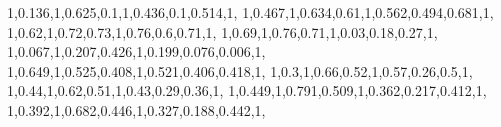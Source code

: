 \documentclass[
]{book}
\newenvironment{Shaded}{\begin{snugshade}}{\end{snugshade}}
\newcommand{\DecValTok}[1]{\textcolor[rgb]{0.00,0.00,0.81}{#1}}
\newcommand{\FloatTok}[1]{\textcolor[rgb]{0.00,0.00,0.81}{#1}}
\newcommand{\NormalTok}[1]{#1}
\begin{document}
\begin{Shaded}
\begin{Highlighting}[]
        \DecValTok{1}\NormalTok{,}\FloatTok{0.136}\NormalTok{,}\DecValTok{1}\NormalTok{,}\FloatTok{0.625}\NormalTok{,}\FloatTok{0.1}\NormalTok{,}\DecValTok{1}\NormalTok{,}\FloatTok{0.436}\NormalTok{,}\FloatTok{0.1}\NormalTok{,}\FloatTok{0.514}\NormalTok{,}\DecValTok{1}\NormalTok{,}
        \DecValTok{1}\NormalTok{,}\FloatTok{0.467}\NormalTok{,}\DecValTok{1}\NormalTok{,}\FloatTok{0.634}\NormalTok{,}\FloatTok{0.61}\NormalTok{,}\DecValTok{1}\NormalTok{,}\FloatTok{0.562}\NormalTok{,}\FloatTok{0.494}\NormalTok{,}\FloatTok{0.681}\NormalTok{,}\DecValTok{1}\NormalTok{,}
        \DecValTok{1}\NormalTok{,}\FloatTok{0.62}\NormalTok{,}\DecValTok{1}\NormalTok{,}\FloatTok{0.72}\NormalTok{,}\FloatTok{0.73}\NormalTok{,}\DecValTok{1}\NormalTok{,}\FloatTok{0.76}\NormalTok{,}\FloatTok{0.6}\NormalTok{,}\FloatTok{0.71}\NormalTok{,}\DecValTok{1}\NormalTok{,}
        \DecValTok{1}\NormalTok{,}\FloatTok{0.69}\NormalTok{,}\DecValTok{1}\NormalTok{,}\FloatTok{0.76}\NormalTok{,}\FloatTok{0.71}\NormalTok{,}\DecValTok{1}\NormalTok{,}\FloatTok{0.03}\NormalTok{,}\FloatTok{0.18}\NormalTok{,}\FloatTok{0.27}\NormalTok{,}\DecValTok{1}\NormalTok{,}
        \DecValTok{1}\NormalTok{,}\FloatTok{0.067}\NormalTok{,}\DecValTok{1}\NormalTok{,}\FloatTok{0.207}\NormalTok{,}\FloatTok{0.426}\NormalTok{,}\DecValTok{1}\NormalTok{,}\FloatTok{0.199}\NormalTok{,}\FloatTok{0.076}\NormalTok{,}\FloatTok{0.006}\NormalTok{,}\DecValTok{1}\NormalTok{,}
        \DecValTok{1}\NormalTok{,}\FloatTok{0.649}\NormalTok{,}\DecValTok{1}\NormalTok{,}\FloatTok{0.525}\NormalTok{,}\FloatTok{0.408}\NormalTok{,}\DecValTok{1}\NormalTok{,}\FloatTok{0.521}\NormalTok{,}\FloatTok{0.406}\NormalTok{,}\FloatTok{0.418}\NormalTok{,}\DecValTok{1}\NormalTok{,}
        \DecValTok{1}\NormalTok{,}\FloatTok{0.3}\NormalTok{,}\DecValTok{1}\NormalTok{,}\FloatTok{0.66}\NormalTok{,}\FloatTok{0.52}\NormalTok{,}\DecValTok{1}\NormalTok{,}\FloatTok{0.57}\NormalTok{,}\FloatTok{0.26}\NormalTok{,}\FloatTok{0.5}\NormalTok{,}\DecValTok{1}\NormalTok{,}
        \DecValTok{1}\NormalTok{,}\FloatTok{0.44}\NormalTok{,}\DecValTok{1}\NormalTok{,}\FloatTok{0.62}\NormalTok{,}\FloatTok{0.51}\NormalTok{,}\DecValTok{1}\NormalTok{,}\FloatTok{0.43}\NormalTok{,}\FloatTok{0.29}\NormalTok{,}\FloatTok{0.36}\NormalTok{,}\DecValTok{1}\NormalTok{,}
        \DecValTok{1}\NormalTok{,}\FloatTok{0.449}\NormalTok{,}\DecValTok{1}\NormalTok{,}\FloatTok{0.791}\NormalTok{,}\FloatTok{0.509}\NormalTok{,}\DecValTok{1}\NormalTok{,}\FloatTok{0.362}\NormalTok{,}\FloatTok{0.217}\NormalTok{,}\FloatTok{0.412}\NormalTok{,}\DecValTok{1}\NormalTok{,}
        \DecValTok{1}\NormalTok{,}\FloatTok{0.392}\NormalTok{,}\DecValTok{1}\NormalTok{,}\FloatTok{0.682}\NormalTok{,}\FloatTok{0.446}\NormalTok{,}\DecValTok{1}\NormalTok{,}\FloatTok{0.327}\NormalTok{,}\FloatTok{0.188}\NormalTok{,}\FloatTok{0.442}\NormalTok{,}\DecValTok{1}\NormalTok{,}

\end{Highlighting}
\end{Shaded}
\end{document}

